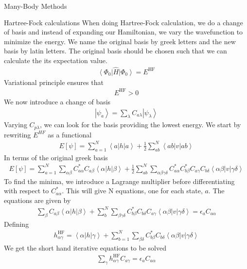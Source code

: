 \documentclass[twoside,english]{uiofysmaster}
\begin{document}
\begin{chapter}{Many-Body Methods}
	\begin{section}{Hartree-Fock calculations}
 		When doing Hartree-Fock calculation, we do a change of basis and instead of expanding our Hamiltonian, we vary the wavefunction to minimize the energy. We name the original basis by greek letters and the new basis by latin letters. The original basis should be chosen such that we can calculate the its expectation value. 
 		\begin{align}
 			\left< \Phi_0 \right| \hat H \left| \Phi_0 \right> = E^{\text{HF}}
 		\end{align}
 		Variational principle ensures that 
 		\begin{align}
 			E^{\text{HF}} > 0 
 		\end{align}
 		We now introduce a change of basis 
 		\begin{align}
 			\left| \psi_a \right> = \sum_{\lambda} C_{a\lambda} \left| \psi_{\lambda} \right>
 		\end{align}
 		Varying $C_{p\lambda}$, we can look for the basis providing the lowest energy. We start by rewriting $E^{HF}$ as a functional
 		\begin{align}
 			E\left[ \psi \right] = \sum_{a=1}^N \left< a \right| h \left| a \right> + \frac{1}{2} \sum_{ab}^N \left< ab \right| v \left| ab \right>
  		\end{align}
  		In terms of the original greek basis
  		\begin{align}
  			E\left[ \psi \right] = \sum_{a=1}^N \sum_{\alpha \beta} C_{a \alpha}^* C_{a \beta} \left< \alpha \right| h \left| \beta \right> + \frac{1}{2} \sum_{ab}^N \sum_{\alpha \beta \gamma \delta} C_{a \alpha}^* C_{b \beta}^* C_{a \gamma} C_{b \delta} \left< \alpha \beta \right| v \left| \gamma \delta \right>
  		\end{align}
  		To find the minima, we introduce a Lagrange multiplier before differentiating with respect to $C_{a  \alpha}^*$. This will give N equations, one for each state, $a$. The equations are given by
  		\begin{align}
  			\sum_{\beta} C_{a \beta} \left< \alpha \right| h \left| \beta \right> + \sum_b^N \sum_{\beta \gamma \delta} C_{b \beta}^* C_{b \delta} C_{a \gamma} \left< \alpha \beta \right| v \left| \gamma \delta \right> = \epsilon_a C_{a \alpha}
  		\end{align}
  		Defining
  		\begin{align}
  			h_{\alpha \gamma}^{\text{HF}} = \left< \alpha \right| h \left| \gamma \right> + \sum_{b=1}^N \sum_{\beta \delta} C_{b \beta}^* C_{b \delta} \left< \alpha \beta \right| v \left| \gamma \delta \right> 
  		\end{align}
  		We get the short hand iterative equations to be solved 
  		\begin{align}
  			\sum_{\gamma} h_{\alpha \gamma}^{\text{HF}} C_{a \gamma} = \epsilon_{a} C_{a \alpha}
  		\end{align}
 	\end{section}

\end{chapter}
\end{document}
